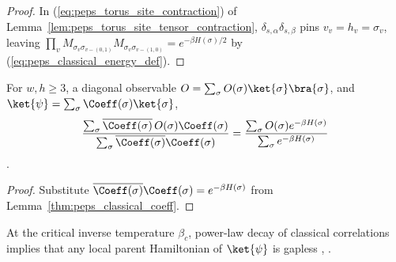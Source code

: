 \begin{proof}\leanok
    In (\ref{eq:peps_torus_site_contraction}) of
    Lemma~\ref{lem:peps_torus_site_tensor_contraction},
    $\delta_{s,\alpha}\delta_{s,\beta}$ pins $v_v=h_v=\sigma_v$, leaving
    $\prod_v M_{\sigma_v\sigma_{v-(0,1)}}M_{\sigma_v\sigma_{v-(1,0)}}=e^{-\beta H(\sigma)/2}$
    by (\ref{eq:peps_classical_energy_def}).
\end{proof}

\begin{lemma}%
    \label{thm:peps_classical_expectation}
    \leanok
    For $w,h\ge 3$, a diagonal observable
    $O=\sum_{\sigma}O(\sigma)\ket{\sigma}\bra{\sigma}$, and
    $\ket{\psi}=\sum_{\sigma}\Coeff(\sigma)\ket{\sigma}$,
    \begin{align}
        \frac{\sum_{\sigma}\overline{\Coeff(\sigma)}\,O(\sigma)\Coeff(\sigma)}
        {\sum_{\sigma}\overline{\Coeff(\sigma)}\Coeff(\sigma)}
        =\frac{\sum_{\sigma}O(\sigma)e^{-\beta H(\sigma)}}
        {\sum_{\sigma}e^{-\beta H(\sigma)}}
        \notag
    \end{align}
    \cite[Appendix~A, ``PEPS from classical models'']{Cirac2021Matrix}.
\end{lemma}

\begin{proof}\leanok
    Substitute $\overline{\Coeff(\sigma)}\Coeff(\sigma)=e^{-\beta H(\sigma)}$
    from Lemma~\ref{thm:peps_classical_coeff}.
\end{proof}

At the critical inverse temperature $\beta_c$, power-law decay of classical
correlations implies that any local parent Hamiltonian of $\ket{\psi}$ is
gapless \cite[Appendix~A, ``PEPS from classical models'']{Cirac2021Matrix},
\cite{Hastings2006Spectral,Nachtergaele2006LiebRobinson}.
